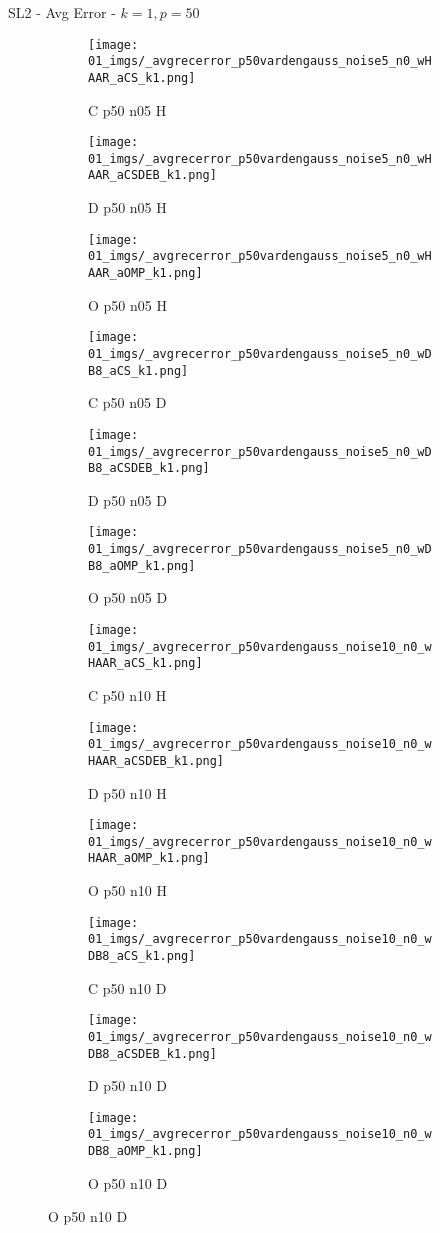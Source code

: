 \begin{frame}{SL2 - Avg Error - $k=1,p=50$}{}
\begin{figure}
\begin{subfigure}{0.13\textwidth}
\texttt{[image: 01\_imgs/\_avgrecerror\_p50vardengauss\_noise5\_n0\_wHAAR\_aCS\_k1.png]}
\caption*{\tiny C p50 n05 H}
\end{subfigure}
\begin{subfigure}{0.13\textwidth}
\texttt{[image: 01\_imgs/\_avgrecerror\_p50vardengauss\_noise5\_n0\_wHAAR\_aCSDEB\_k1.png]}
\caption*{\tiny D p50 n05 H}
\end{subfigure}
\begin{subfigure}{0.13\textwidth}
\texttt{[image: 01\_imgs/\_avgrecerror\_p50vardengauss\_noise5\_n0\_wHAAR\_aOMP\_k1.png]}
\caption*{\tiny O p50 n05 H}
\end{subfigure}
\begin{subfigure}{0.13\textwidth}
\texttt{[image: 01\_imgs/\_avgrecerror\_p50vardengauss\_noise5\_n0\_wDB8\_aCS\_k1.png]}
\caption*{\tiny C p50 n05 D}
\end{subfigure}
\begin{subfigure}{0.13\textwidth}
\texttt{[image: 01\_imgs/\_avgrecerror\_p50vardengauss\_noise5\_n0\_wDB8\_aCSDEB\_k1.png]}
\caption*{\tiny D p50 n05 D}
\end{subfigure}
\begin{subfigure}{0.13\textwidth}
\texttt{[image: 01\_imgs/\_avgrecerror\_p50vardengauss\_noise5\_n0\_wDB8\_aOMP\_k1.png]}
\caption*{\tiny O p50 n05 D}
\end{subfigure}

\vspace{5pt}

\begin{subfigure}{0.13\textwidth}
\texttt{[image: 01\_imgs/\_avgrecerror\_p50vardengauss\_noise10\_n0\_wHAAR\_aCS\_k1.png]}
\caption*{\tiny C p50 n10 H}
\end{subfigure}
\begin{subfigure}{0.13\textwidth}
\texttt{[image: 01\_imgs/\_avgrecerror\_p50vardengauss\_noise10\_n0\_wHAAR\_aCSDEB\_k1.png]}
\caption*{\tiny D p50 n10 H}
\end{subfigure}
\begin{subfigure}{0.13\textwidth}
\texttt{[image: 01\_imgs/\_avgrecerror\_p50vardengauss\_noise10\_n0\_wHAAR\_aOMP\_k1.png]}
\caption*{\tiny O p50 n10 H}
\end{subfigure}
\begin{subfigure}{0.13\textwidth}
\texttt{[image: 01\_imgs/\_avgrecerror\_p50vardengauss\_noise10\_n0\_wDB8\_aCS\_k1.png]}
\caption*{\tiny C p50 n10 D}
\end{subfigure}
\begin{subfigure}{0.13\textwidth}
\texttt{[image: 01\_imgs/\_avgrecerror\_p50vardengauss\_noise10\_n0\_wDB8\_aCSDEB\_k1.png]}
\caption*{\tiny D p50 n10 D}
\end{subfigure}
\begin{subfigure}{0.13\textwidth}
\texttt{[image: 01\_imgs/\_avgrecerror\_p50vardengauss\_noise10\_n0\_wDB8\_aOMP\_k1.png]}
\caption*{\tiny O p50 n10 D}
\end{subfigure}


\end{figure}
\end{frame}
